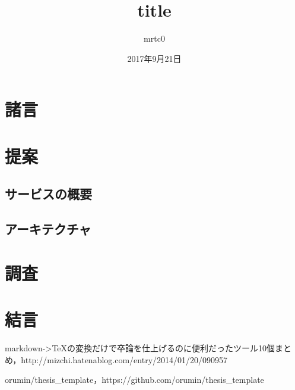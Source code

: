 \documentclass[shinchoku]{hitsotsuron} %
\title{title}
\author{mrtc0}
\date{2017年9月21日}
\begin{document}

\twocolumn[%
\maketitle
]

\section{諸言}



\section{提案}



\subsection{サービスの概要}


\subsection{アーキテクチャ}


\section{調査}


\section{結言}


\begin{thebibliography}{1}

markdown->TeXの変換だけで卒論を仕上げるのに便利だったツール10個まとめ，http://mizchi.hatenablog.com/entry/2014/01/20/090957

orumin/thesis\_template，https://github.com/orumin/thesis\_template

\end{thebibliography}
\end{document}
